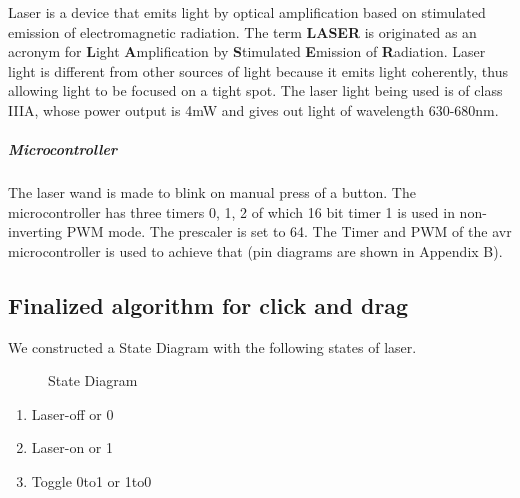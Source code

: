 \documentclass[12pt, a4paper]{article}
\begin{document}
Laser is a device that emits light by optical amplification based on stimulated emission of electromagnetic radiation. The term \textbf{LASER} is originated as an acronym for \textbf{L}ight \textbf{A}mplification by \textbf{S}timulated \textbf{E}mission of \textbf{R}adiation. Laser light is different from other sources of light because it emits light coherently, thus allowing light to be focused on a tight spot. The laser light being used is of class IIIA, whose power output is 4mW and gives out light of wavelength 630-680nm. 

\subparagraph{Microcontroller}

The laser wand is made to blink on manual press of a button. The microcontroller has three timers 0, 1, 2 of which 16 bit timer 1 is used in non-inverting PWM mode. The prescaler is set to 64. The Timer and PWM of the avr microcontroller is used to achieve that (pin diagrams are shown in Appendix B).

\subsection{Finalized algorithm for click and drag}
	We constructed a State Diagram with the following states of laser.
	\begin{figure}
\centering
{}
\caption{State Diagram}
\end{figure}
\begin{enumerate}
\item Laser-off or 0
\item Laser-on or 1
\item Toggle 0to1 or 1to0 
\end{enumerate}
\end{document}
